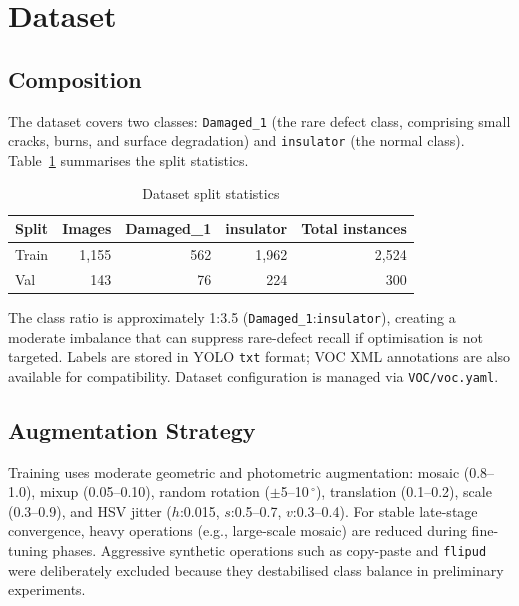 \documentclass[11pt,a4paper]{article}
\begin{document}
\section{Dataset}
\label{sec:dataset}

\subsection{Composition}

The dataset covers two classes: \texttt{Damaged\_1} (the rare defect class, comprising
small cracks, burns, and surface degradation) and \texttt{insulator} (the normal class).
Table~\ref{tab:dataset} summarises the split statistics.

\begin{table}[H]
\centering
\caption{Dataset split statistics}
\label{tab:dataset}
\begin{tabular}{lrrrr}
\toprule
\textbf{Split} & \textbf{Images} &
\textbf{Damaged\_1} & \textbf{insulator} & \textbf{Total instances} \\
\midrule
Train & 1{,}155 & 562  & 1{,}962 & 2{,}524 \\
Val   &   143   &  76  &   224   &   300   \\
\bottomrule
\end{tabular}
\end{table}

The class ratio is approximately 1:3.5 (\texttt{Damaged\_1}:\texttt{insulator}), creating
a moderate imbalance that can suppress rare-defect recall if optimisation is not targeted.
Labels are stored in YOLO \texttt{txt} format; VOC XML annotations are also available for
compatibility. Dataset configuration is managed via \texttt{VOC/voc.yaml}.

\subsection{Augmentation Strategy}

Training uses moderate geometric and photometric augmentation: mosaic (0.8--1.0), mixup
(0.05--0.10), random rotation ($\pm$5--10\,$^\circ$), translation (0.1--0.2), scale
(0.3--0.9), and HSV jitter ($h$:0.015, $s$:0.5--0.7, $v$:0.3--0.4). For stable
late-stage convergence, heavy operations (e.g., large-scale mosaic) are reduced during
fine-tuning phases. Aggressive synthetic operations such as copy-paste and \texttt{flipud}
were deliberately excluded because they destabilised class balance in preliminary
experiments.
\end{document}
